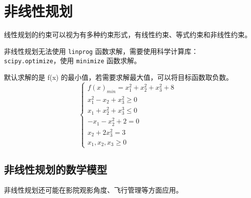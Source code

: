 \section{非线性规划}

\begin{tips}
    线性规划的约束可以视为有多种约束形式，有线性约束、等式约束和非线性约束。
\end{tips}

非线性规划无法使用 \texttt{linprog} 函数求解，需要使用科学计算库：\texttt{scipy.optimize}，使用 \texttt{minimize} 函数求解。

\begin{example}
    默认求解的是 f(x) 的最小值，若需要求解最大值，可以将目标函数取负数。
    $$
        \begin{cases}
            f(x)_{min}=x_1^2+x_2^2+x_3^2+8 \\
            x_1^2-x_2+x_3^2 \geq 0         \\
            x_1+x_2^2+x_3^3 \leq 0         \\
            -x_1-x_2^2+2=0                 \\
            x_2+2 x_3^2=3                  \\
            x_1, x_2, x_3 \geq 0
        \end{cases}
    $$
\end{example}

\begin{solution}

\end{solution}

\subsection{非线性规划的数学模型}

非线性规划还可能在影院观影角度、飞行管理等方面应用。

